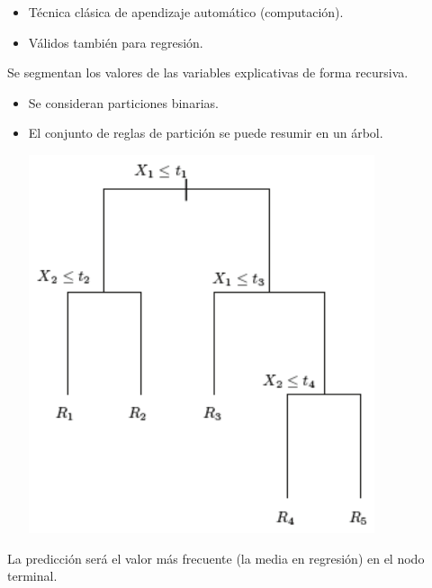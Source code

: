 \documentclass[]{book}
\begin{document}
\begin{itemize}
\item
  Técnica clásica de apendizaje automático (computación).
\item
  Válidos también para regresión.
\end{itemize}

Se segmentan los valores de las variables explicativas de forma
recursiva.

\begin{itemize}
\item
  Se consideran particiones binarias.
\item
  El conjunto de reglas de partición se puede resumir en un árbol.

  \includegraphics[width=4in]{images/arbol1}
\end{itemize}

La predicción será el valor más frecuente (la media en regresión) en el
nodo terminal.
\end{document}
